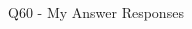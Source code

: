 \begin{frame}{Q60 - My Answer Responses}
\begin{multicols}{2}
    \begin{minipage}{\linewidth}
    \RaggedRight\textbf{\tiny {}} \\ 
    \vspace{4.00pt}
    \end{minipage}
    \vspace{10pt}


 \end{multicols}
\end{frame}
